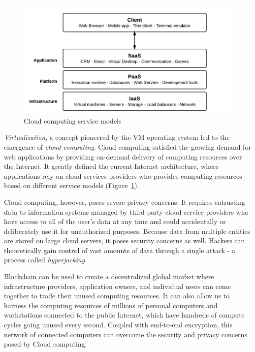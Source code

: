 	\begin{figure}[h]
		\includegraphics[width=\linewidth]{figures/service-models}
		\caption{\label{fig:service-models} Cloud computing service models\protect\cite{image:cloud:1}}
	\end{figure}
	
	\textit{Virtualization}\cite{pub:vm:1}, a concept pioneered by the VM\cite{creasy1981origin} operating system led to the emergence of \textit{cloud computing}. Cloud computing satisfied the growing demand for web applications by providing on-demand delivery of computing resources over the Internet. It greatly defined the current Internet architecture, where applications rely on cloud services providers who provides computing resources based on different service models (Figure~\ref{fig:service-models}).
	
	Cloud computing, however, poses severe privacy concerns. It requires entrusting data to information systems managed by third-party cloud service providers who have access to all of the user's data at any time and could accidentally or deliberately use it for unauthorized purposes\cite{ryan2011cloud}. Because data from multiple entities are stored on large cloud servers, it poses security concerns as well. Hackers can theoretically gain control of vast amounts of data through a single attack - a process called \textit{hyperjacking}\cite{pub:hyperjack:1}.
	
	Blockchain can be used to create a decentralized global market where infrastructure providers,  application owners, and individual users can come together to trade their unused computing resources. It can also allow us to harness the computing resources of millions of personal computers and workstations connected to the public Internet, which have hundreds of compute cycles going unused every second\cite{crowcroft2003peer}. Coupled with end-to-end encryption, this network of connected computers can overcome the security and privacy concerns posed by Cloud computing.
	
